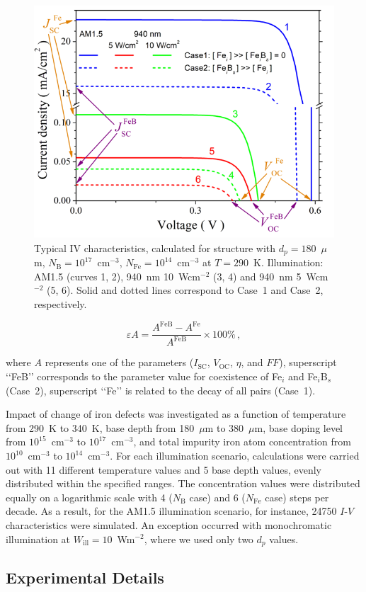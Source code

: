 \documentclass[a4paper,fleqn]{cas-sc}
\begin{document}
\begin{figure}
	\centering
		\includegraphics[width=0.5\linewidth]{Figure2.png}
	  \caption{Typical IV characteristics,
   calculated for structure with $d_p = 180$~$\mu$m, $N_\mathrm{B}=10^{17}$~cm$^{-3}$,
   $N_\mathrm{Fe}=10^{14}$~cm$^{-3}$ at $T = 290$~K.
   Illumination: AM1.5 (curves 1, 2), 940~nm 10~Wcm$^{-2}$ (3, 4) and 940~nm 5~Wcm$^{-2}$ (5, 6).
   Solid and dotted lines correspond to Case~1 and Case~2, respectively.}\label{fig2}
\end{figure}


\begin{equation}
    \varepsilon A = \frac{A^\mathrm{FeB} - A^\mathrm{Fe}}{A^\mathrm{FeB}} \times 100 \%\,,
\end{equation}

where $A$ represents one of the parameters ($I_\mathrm{SC}$, $V_\mathrm{OC}$, $\eta$, and $FF$),
superscript ‘‘FeB’’ corresponds to the parameter value for coexistence of Fe$_i$ and Fe$_i$B$_s$ (Case~2),
superscript ‘‘Fe’’ is related to the decay of all pairs (Case~1).


Impact of change of iron defects was investigated as a function of temperature from 290~K to 340~K,
base depth from 180~$\mu$m to 380~$\mu$m,
base doping level from $10^{15}$~cm$^{-3}$ to $10^{17}$~cm$^{-3}$,
and total impurity iron atom concentration from $10^{10}$~cm$^{-3}$ to $10^{14}$~cm$^{-3}$.
For each illumination scenario, calculations were carried out with 11 different temperature values and 5 base depth values,
evenly distributed within the specified ranges.
The concentration values were distributed equally on a logarithmic scale with 4 ($N_\mathrm{B}$ case) and 6 ($N_\mathrm{Fe}$ case) steps per decade.
As a result, for the AM1.5 illumination scenario, for instance, 24750 $I$-$V$ characteristics were simulated.
An exception occurred with monochromatic illumination at $W_\mathrm{ill} = 10$~Wm$^{-2}$,
where we used only two $d_p$ values.

\subsection{Experimental Details}
\end{document}
